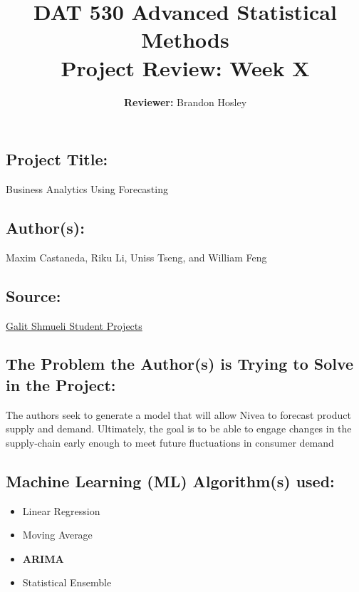 \documentclass[]{article}
\title{\textbf{DAT 530 Advanced Statistical Methods}\\
	\normalsize{Project Review: Week X} }
\author{\textbf{Reviewer: }
	Brandon Hosley}
\begin{document}
\setlength{\droptitle}{-10em} 
\pretitle{\begin{flushleft}\LARGE} %
	\posttitle{\end{flushleft}}
\preauthor{\begin{flushleft}\large} %
	\postauthor{\end{flushleft}}
\predate{\begin{flushleft}\large} %
	\postdate{\end{flushleft}}
\maketitle

\vspace{-2em}

\subsection*{Project Title:}
Business Analytics Using Forecasting

\subsection*{Author(s):}
 Maxim Castaneda, Riku Li, Uniss Tseng, and William Feng

\subsection*{Source:}
\href{https://www.galitshmueli.com/data-mining-project/enhancing-supply-chain-efficiency-through-demand-forecasting-nivea}{Galit Shmueli Student Projects}

\subsection*{The Problem the Author(s) is Trying to Solve in the Project:}
The authors seek to generate a model that will allow Nivea to forecast product supply and demand. Ultimately, the goal is to be able to engage changes in the supply-chain early enough to meet future fluctuations in consumer demand 

\subsection*{Machine Learning (ML) Algorithm(s) used:}
\begin{itemize}
	\item Linear Regression
	\item Moving Average
	\item \textbf{ARIMA}
	\item Statistical Ensemble
\end{itemize}
\end{document}
